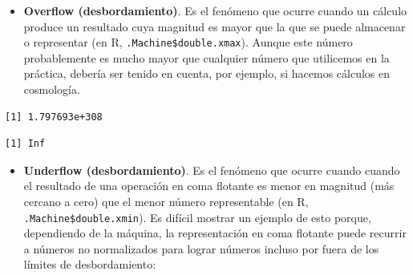\documentclass[]{book}
\newenvironment{Shaded}{\begin{snugshade}}{\end{snugshade}}
\newcommand{\CommentTok}[1]{\textcolor[rgb]{0.56,0.35,0.01}{\textit{#1}}}
\newcommand{\DecValTok}[1]{\textcolor[rgb]{0.00,0.00,0.81}{#1}}
\newcommand{\NormalTok}[1]{#1}
\newcommand{\OperatorTok}[1]{\textcolor[rgb]{0.81,0.36,0.00}{\textbf{#1}}}
\newcommand{\StringTok}[1]{\textcolor[rgb]{0.31,0.60,0.02}{#1}}
\providecommand{\tightlist}{%
  \setlength{\itemsep}{0pt}\setlength{\parskip}{0pt}}
\begin{document}
\begin{itemize}
\tightlist
\item
  \textbf{Overflow (desbordamiento)}. Es el fenómeno que ocurre cuando un cálculo produce un resultado cuya magnitud es mayor que la que se puede almacenar o representar (en R, \texttt{.Machine\$double.xmax}). Aunque este número probablemente es mucho mayor que cualquier número que utilicemos en la práctica, debería ser tenido en cuenta, por ejemplo, si hacemos cálculos en cosmología.
\end{itemize}

\begin{Shaded}
\end{Shaded}

\begin{verbatim}
[1] 1.797693e+308
\end{verbatim}

\begin{Shaded}
\end{Shaded}

\begin{verbatim}
[1] Inf
\end{verbatim}

\begin{itemize}
\tightlist
\item
  \textbf{Underflow (desbordamiento)}. Es el fenómeno que ocurre cuando cuando el resultado de una operación en coma flotante es menor en magnitud (más cercano a cero) que el menor número representable (en R, \texttt{.Machine\$double.xmin}). Es difícil mostrar un ejemplo de esto porque, dependiendo de la máquina, la representación en coma flotante puede recurrir a números no normalizados para lograr números incluso por fuera de los límites de desbordamiento:
\end{itemize}

\begin{Shaded}
\end{Shaded}
\end{document}
